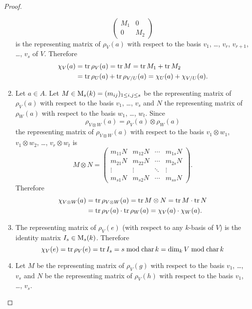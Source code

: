 \begin{proof}
\begin{enumerate}[label=\emph{\alph*)},leftmargin=*]
\[\begin{pmatrix}
                    M_1 & 0 \\
                    0 & M_2
                  \end{pmatrix}
      \]
      is the representing matrix of $\rho_V(a)$ with respect to the basis $v_1$, \dots, $v_r$, $v_{r+1}$, \dots, $v_s$ of $V$.
      Therefore
      \begin{align*}
            \chi_V(a)
        &=  \operatorname{tr} \rho_V(a)
         =  \operatorname{tr} M
         =  \operatorname{tr} M_1 + \operatorname{tr} M_2 \\
        &=  \operatorname{tr} \rho_U(a) + \operatorname{tr} \rho_{V/U}(a)
         =  \chi_U(a) + \chi_{V/U}(a).
      \end{align*}
    \item
      Let $a \in A$.
      Let $M \in \operatorname{M}_s(k) = (m_{ij})_{1 \leq i,j \leq s}$ be the representing matrix of $\rho_V(a)$ with respect to the basis $v_1$, \dots, $v_s$ and $N$ the representing matrix of $\rho_W(a)$ with respect to the basis $w_1$, \dots, $w_t$.
      Since
      \[
          \rho_{V \otimes W}(a)
        = \rho_V(a) \otimes \rho_W(a)
      \]
      the representing matrix of $\rho_{V \otimes W}(a)$ with respect to the basis $v_1 \otimes w_1$, $v_1 \otimes w_2$, \dots, $v_r \otimes w_t$ is
      \[
          M \otimes N
        = \begin{pmatrix}
            m_{11} N & m_{12} N & \cdots & m_{1s} N \\
            m_{21} N & m_{22} N & \cdots & m_{2s} N \\
            \vdots   & \vdots   & \ddots & \vdots   \\
            m_{s1} N & m_{s2} N & \cdots & m_{ss} N
          \end{pmatrix}.
      \]
      Therefore
      \begin{align*}
            \chi_{V \otimes W}(a)
        &=  \operatorname{tr} \rho_{V \otimes W}(a)
         =  \operatorname{tr} M \otimes N
         =  \operatorname{tr} M \cdot \operatorname{tr} N \\
        &=  \operatorname{tr} \rho_V(a) \cdot \operatorname{tr} \rho_W(a)
         =  \chi_V(a) \cdot \chi_W(a).
      \end{align*}
    \item
      The representing matrix of $\rho_V(e)$ (with respect to any $k$-basis of $V$) is the identity matrix $I_s \in \operatorname{M}_s(k)$.
      Therefore
      \[
          \chi_V(e)
        = \operatorname{tr} \rho_V(e)
        = \operatorname{tr} I_s
        = s \bmod \operatorname{char} k
        = \dim_k V \bmod \operatorname{char} k
      \]
    \item
      Let $M$ be the representing matrix of $\rho_V(g)$ with respect to the basis $v_1$, \dots, $v_s$ and $N$ be the representing matrix of $\rho_V(h)$ with respect to the basis $v_1$, \dots, $v_s$.

\end{enumerate}
\end{proof}
